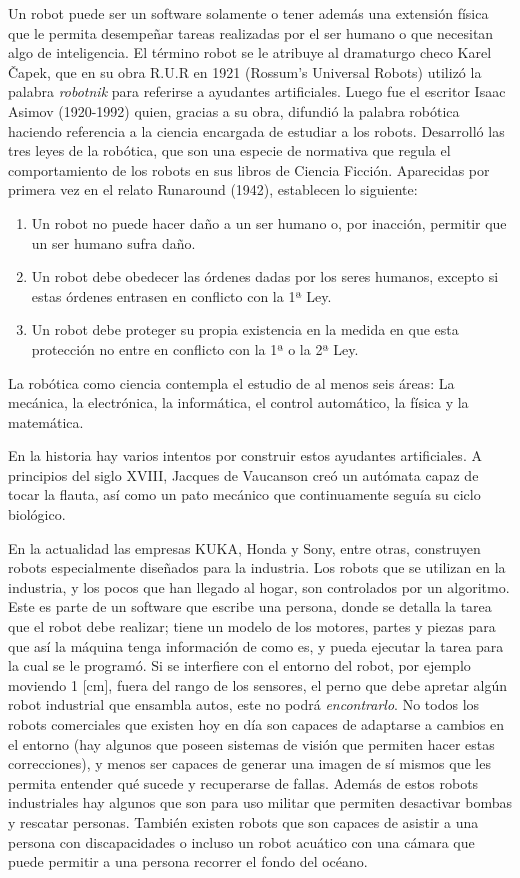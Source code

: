 Un robot puede ser un software solamente o tener además una extensión física que le permita desempeñar tareas realizadas por el ser humano o que necesitan algo de inteligencia. El término robot se le atribuye al dramaturgo checo Karel Čapek, que en su obra R.U.R en 1921 (Rossum’s Universal Robots) utilizó la palabra \textit{robotnik} para referirse a ayudantes artificiales. Luego fue el escritor Isaac Asimov (1920-1992) quien,  gracias a su obra, difundió la palabra robótica haciendo referencia a la ciencia encargada de estudiar a los robots. Desarrolló las tres leyes de la robótica, que son una especie de normativa que regula el comportamiento de los robots en sus libros de Ciencia Ficción. Aparecidas por primera vez en el relato Runaround (1942), establecen lo siguiente:

\begin{enumerate}
\item Un robot no puede hacer daño a un ser humano o, por inacción, permitir que un ser humano sufra daño.
\item Un robot debe obedecer las órdenes dadas por los seres humanos, excepto si estas órdenes entrasen en conflicto con la 1ª Ley.
\item Un robot debe proteger su propia existencia en la medida en que esta protección no entre en conflicto con la 1ª o la 2ª Ley.
\end{enumerate}
La robótica como ciencia contempla el estudio de al menos seis áreas: La mecánica, la electrónica, la informática, el control automático, la física y la matemática.

En la historia hay varios intentos por construir estos ayudantes artificiales. A principios del siglo XVIII, Jacques de Vaucanson creó un autómata capaz de tocar la flauta, así como un pato mecánico que continuamente seguía su ciclo biológico.

En la actualidad las empresas KUKA, Honda y Sony, entre otras, construyen robots especialmente diseñados para la industria. Los robots que se utilizan en la industria, y los pocos que han llegado al hogar, son controlados por un algoritmo. Este es parte de un software que escribe una persona, donde se detalla la tarea que el robot debe realizar; tiene un modelo de los motores, partes y piezas para que así la máquina tenga información de como es, y pueda ejecutar la tarea para la cual se le programó. Si se interfiere con el entorno del robot, por ejemplo moviendo 1 [cm], fuera del rango de los sensores, el perno que debe apretar algún robot industrial que ensambla autos, este no podrá \textit{encontrarlo}. No todos los robots comerciales que existen hoy en día son capaces de adaptarse a cambios en el entorno (hay algunos que poseen sistemas de visión que permiten hacer estas correcciones), y menos ser capaces de generar una imagen de sí mismos que les permita entender qué sucede y recuperarse de fallas. Además de estos robots industriales hay algunos que son para uso militar que permiten desactivar bombas y rescatar personas. También existen robots que son capaces de asistir a una persona con discapacidades o incluso un robot acuático con una cámara que puede permitir a una persona recorrer el fondo del océano. 

